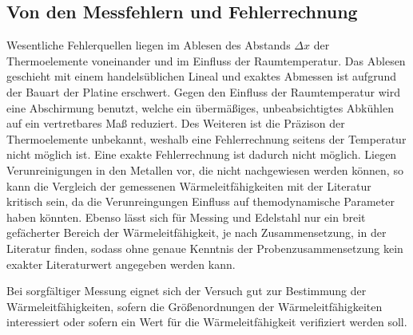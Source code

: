 \subsection{Von den Messfehlern und Fehlerrechnung}
Wesentliche Fehlerquellen liegen im Ablesen des Abstands $\Delta{x}$ der Thermoelemente voneinander und im Einfluss der Raumtemperatur.
Das Ablesen geschieht mit einem handelsüblichen Lineal und exaktes Abmessen ist aufgrund der Bauart der Platine erschwert. 
Gegen den Einfluss der Raumtemperatur wird eine Abschirmung benutzt, welche ein übermäßiges, unbeabsichtigtes Abkühlen auf ein vertretbares Maß reduziert. Des Weiteren ist die Präzison der Thermoelemente unbekannt, weshalb eine Fehlerrechnung seitens der Temperatur nicht möglich ist.
Eine exakte Fehlerrechnung ist dadurch nicht möglich.
Liegen Verunreinigungen in den Metallen vor, die nicht nachgewiesen werden können, so kann die Vergleich der gemessenen Wärmeleitfähigkeiten mit der Literatur kritisch sein, 
da die Verunreingungen Einfluss auf themodynamische Parameter haben könnten. Ebenso lässt sich für Messing und Edelstahl nur ein breit gefächerter Bereich der Wärmeleitfähigkeit, je nach Zusammensetzung, in der Literatur finden, sodass ohne genaue Kenntnis der Probenzusammensetzung kein exakter Literaturwert angegeben werden kann.

Bei sorgfältiger Messung eignet sich der Versuch gut zur Bestimmung der Wärmeleitfähigkeiten, sofern die Größenordnungen der Wärmeleitfähigkeiten interessiert oder sofern ein Wert für die Wärmeleitfähigkeit verifiziert werden soll.

